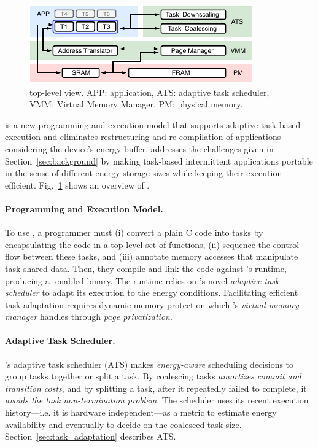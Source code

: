 \begin{figure}
	\centering
	\includegraphics[width=.8\columnwidth]{figures/system-overview.pdf}
	\caption{\sys top-level view. APP: application, ATS: adaptive task scheduler, VMM: Virtual Memory Manager, PM: physical memory.}
	\label{fig:system_overview}
\end{figure}

\sys is a new programming and execution model that supports adaptive task-based execution and eliminates restructuring and re-compilation of applications considering the device's energy buffer. \sys addresses the challenges given in Section~\ref{sec:background} by making task-based intermittent applications portable in the sense of different energy storage sizes while keeping their execution efficient. Fig.~\ref{fig:system_overview} shows an overview of \sys.

\paragraph{Programming and Execution Model.}
To use \sys, a programmer must (i) convert a plain C code into tasks by encapsulating the code in a top-level set of functions, (ii) sequence the control-flow between these tasks, and (iii) annotate memory accesses that manipulate task-shared data. Then, they compile and link the code against \sys's runtime, producing a \sys-enabled binary. The runtime relies on \sys's novel {\em adaptive task scheduler} to adapt its execution to the energy conditions. Facilitating efficient task adaptation requires dynamic memory protection which \sys's \emph{virtual memory manager} handles through \emph{page privatization}.

\paragraph{Adaptive Task Scheduler.}
\sys's adaptive task scheduler (ATS) makes \emph{energy-aware} scheduling decisions to group tasks together or split a task. By coalescing tasks \sys \emph{amortizes commit and transition costs}, and by splitting a task, after it repeatedly failed to complete, it \emph{avoids the task non-termination problem}. The scheduler uses its recent execution history---i.e. it is hardware independent---as a metric to estimate energy availability and eventually to decide on the coalesced task size. Section~\ref{sec:task_adaptation} describes ATS.

